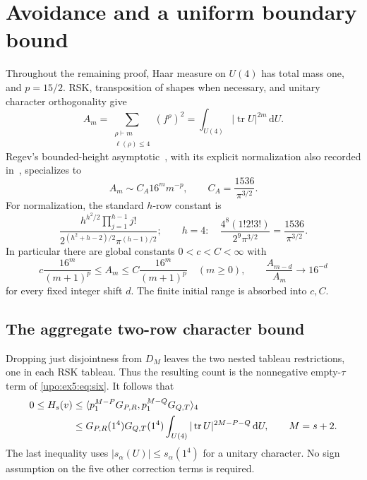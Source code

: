\documentclass[11pt,letterpaper]{article}
\theoremstyle{remark}\newtheorem{remark}[theorem]{Remark}
\numberwithin{equation}{section}
\newcommand{\tr}{\operatorname{tr}}
\newcommand{\dd}{\,\mathrm d}
\newcommand{\ip}[2]{\langle #1,#2\rangle_4}
\begin{document}
\section{Avoidance and a uniform boundary bound}\label{upo:ex5:sec:bounds}
Throughout the remaining proof, Haar measure on $U(4)$ has total
mass one, and $p=15/2$.
RSK, transposition of shapes when necessary, and unitary character
orthogonality give
\begin{equation}\label{upo:ex5:eq:avoid}
 A_m=\sum_{\substack{\rho\vdash m\\\ell(\rho)\le4}}(f^\rho)^2
     =\int_{U(4)}|\tr U|^{2m}\dd U.
\end{equation}
Regev's bounded-height asymptotic~\cite{Regev1981}, with its explicit
normalization also recorded in~\cite[Section 3.1.4]{Regev2010},
specializes to
\begin{equation}\label{upo:ex5:eq:Regev}
 A_m\sim C_A16^m m^{-p},\qquad C_A=\frac{1536}{\pi^{3/2}}.
\end{equation}
For normalization, the standard $h$-row constant is
\[
 \frac{h^{h^2/2}\prod_{j=1}^{h-1}j!}
 {2^{(h^2+h-2)/2}\pi^{(h-1)/2}};
 \qquad h=4:\quad
 \frac{4^8(1!2!3!)}{2^9\pi^{3/2}}
 =\frac{1536}{\pi^{3/2}}.
\]
In particular there are global constants $0<c<C<\infty$ with
\begin{equation}\label{upo:ex5:eq:Abounds}
 c\frac{16^m}{(m+1)^p}\le A_m\le C\frac{16^m}{(m+1)^p}
 \quad(m\ge0),\qquad
 \frac{A_{m-d}}{A_m}\longrightarrow16^{-d}
\end{equation}
for every fixed integer shift $d$. The finite initial range is
absorbed into $c,C$.

\subsection{The aggregate two-row character bound}
Dropping just disjointness from $D_M$ leaves the two nested tableau
restrictions, one in each RSK tableau. Thus the resulting count is
the nonnegative empty-$\tau$ term of \eqref{upo:ex5:eq:six}. It follows that
\begin{align}\label{upo:ex5:eq:drop}
 0\le H_s(v)
 &\le\ip{p_1^{M-P}G_{P,R}}{p_1^{M-Q}G_{Q,T}}\notag\\
 &\le G_{P,R}(1^4)G_{Q,T}(1^4)
       \int_{U(4)}|\tr U|^{2M-P-Q}\dd U,
 \qquad M=s+2.
\end{align}
The last inequality uses $|s_\alpha(U)|\le s_\alpha(1^4)$ for a
unitary character. No sign assumption on the five other correction
terms is required.
\end{document}
